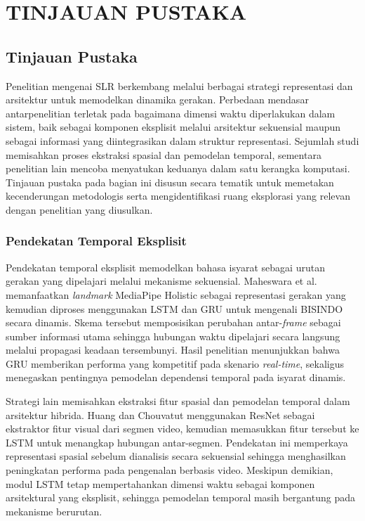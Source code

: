 \newpage
\chapter{TINJAUAN PUSTAKA} \label{bab:tinjauan-pustaka}

\section{Tinjauan Pustaka} \label{sec:tinjauan-pustaka}
Penelitian mengenai SLR berkembang melalui berbagai strategi representasi dan arsitektur untuk memodelkan dinamika gerakan. 
Perbedaan mendasar antarpenelitian terletak pada bagaimana dimensi waktu diperlakukan dalam sistem, baik sebagai komponen eksplisit melalui arsitektur sekuensial maupun sebagai informasi yang diintegrasikan dalam struktur representasi. 
Sejumlah studi memisahkan proses ekstraksi spasial dan pemodelan temporal, sementara penelitian lain mencoba menyatukan keduanya dalam satu kerangka komputasi. 
Tinjauan pustaka pada bagian ini disusun secara tematik untuk memetakan kecenderungan metodologis serta mengidentifikasi ruang eksplorasi yang relevan dengan penelitian yang diusulkan.

\subsection{Pendekatan Temporal Eksplisit} \label{subsec:temporal-eksplisit}

Pendekatan temporal eksplisit memodelkan bahasa isyarat sebagai urutan gerakan yang dipelajari melalui mekanisme sekuensial. 
Maheswara et al. \cite{maheswara2023lstmbisindo} memanfaatkan \textit{landmark} MediaPipe Holistic sebagai representasi gerakan yang kemudian diproses menggunakan LSTM dan GRU untuk mengenali BISINDO secara dinamis. 
Skema tersebut memposisikan perubahan antar-\textit{frame} sebagai sumber informasi utama sehingga hubungan waktu dipelajari secara langsung melalui propagasi keadaan tersembunyi. 
Hasil penelitian menunjukkan bahwa GRU memberikan performa yang kompetitif pada skenario \textit{real-time}, sekaligus menegaskan pentingnya pemodelan dependensi temporal pada isyarat dinamis.

Strategi lain memisahkan ekstraksi fitur spasial dan pemodelan temporal dalam arsitektur hibrida. 
Huang dan Chouvatut \cite{huang2024videoresnetlstm} menggunakan ResNet sebagai ekstraktor fitur visual dari segmen video, kemudian memasukkan fitur tersebut ke LSTM untuk menangkap hubungan antar-segmen. 
Pendekatan ini memperkaya representasi spasial sebelum dianalisis secara sekuensial sehingga menghasilkan peningkatan performa pada pengenalan berbasis video. 
Meskipun demikian, modul LSTM tetap mempertahankan dimensi waktu sebagai komponen arsitektural yang eksplisit, sehingga pemodelan temporal masih bergantung pada mekanisme berurutan.

